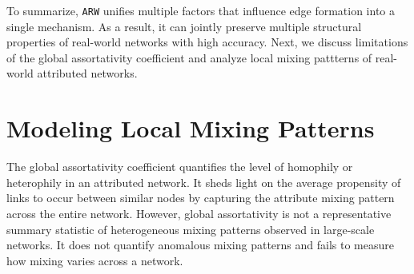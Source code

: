 To summarize, \texttt{ARW} unifies multiple factors that influence edge formation
into a single mechanism. As a result, it can jointly preserve multiple structural
properties of real-world networks with high accuracy. Next, we discuss limitations
of the global assortativity coefficient and analyze local mixing pattterns of
real-world attributed networks.

\clearpage
\section{Modeling Local Mixing Patterns}
\label{subsec:LocalMixing}

The global assortativity coefficient quantifies
the level of homophily or heterophily in an attributed network. It sheds light
on the average propensity of links to occur between similar nodes by capturing
the attribute mixing pattern across the entire network.
However, global assortativity is not a representative summary statistic of heterogeneous mixing patterns
observed in large-scale networks. It does not quantify anomalous mixing patterns and
fails to measure how mixing varies across a network.

